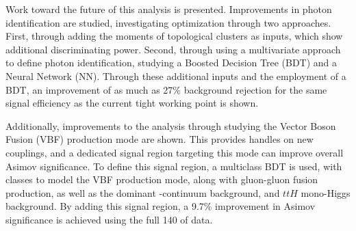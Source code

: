 Work toward the future of this analysis is presented. Improvements in photon identification are studied, investigating optimization through two approaches. First, through adding the moments of topological clusters as inputs, which show additional discriminating power. Second, through using a multivariate approach to define photon identification, studying a Boosted Decision Tree (BDT) and a Neural Network (NN). Through these additional inputs and the employment of a BDT, an improvement of as much as 27\% background rejection for the same signal efficiency as the current tight working point is shown.

Additionally, improvements to the analysis through studying the Vector Boson Fusion (VBF) production mode are shown. This provides handles on new couplings, and a dedicated signal region targeting this mode can improve overall Asimov significance. To define this signal region, a multiclass BDT is used, with classes to model the VBF \hh production mode, along with gluon-gluon fusion \hh production, as well as the dominant \yy-continuum background, and $ttH$ mono-Higgs background. By adding this signal region, a 9.7\% improvement in Asimov significance is achieved using the full 140 \ifb of \RunTwo data. 